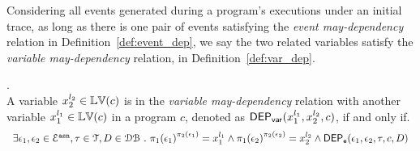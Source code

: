 Considering 
all events generated during a program's executions
under an initial trace,
as long as there is one pair of events satisfying the \emph{event may-dependency} relation in Definition~\ref{def:event_dep}, 
 we say the two 
related
variables satisfy the \emph{variable may-dependency} relation, in Definition~\ref{def:var_dep}.
\begin{defn}.
  \label{def:var_dep}
  \\
  A variable ${x}_2^{l_2} \in \mathbb{LV}(c)$ is in the \emph{variable may-dependency} relation with another
  variable ${x}_1^{l_1} \in \mathbb{LV}(c)$ in a program ${c}$, denoted as 
  $\mathsf{DEP_{var}}({x}_1^{l_1}, {x}_2^{l_2}, {c})$, if and only if.
\[
  \begin{array}{l}
\exists \event_1, \event_2 \in \eventset^{\asn}, \trace \in \mathcal{T} , D \in \dbdom \sthat
\pi_{1}{(\event_1)}^{\pi_{2}{(\event_1)}} = {x}_1^{l_1}
\land
\pi_{1}{(\event_2)}^{\pi_{2}{(\event_2)}} = {x}_2^{l_2}%
\land 
\eventdep(\event_1, \event_2, \trace, c, D) 
  \end{array}
\]  %
  \end{defn}
